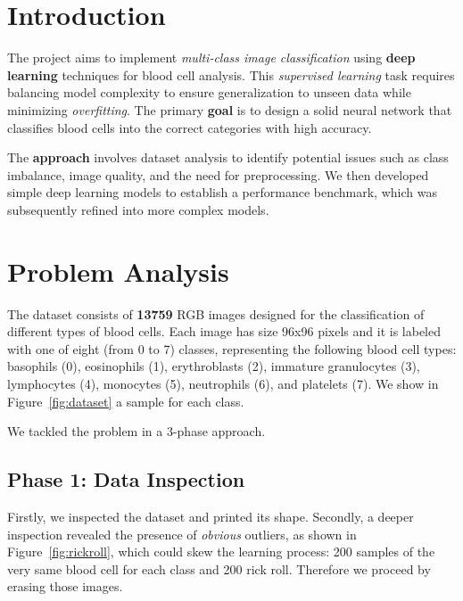 \documentclass[11pt]{article}
\begin{document}
    \begin{multicols*}{2}        
        \section{Introduction}

        The project aims to implement \textit{multi-class image classification} using \textbf{deep learning} techniques for blood cell analysis. This \textit{supervised learning} task requires balancing model complexity to ensure generalization to unseen data while minimizing \textit{overfitting}. The primary \textbf{goal} is to design a solid neural network that classifies blood cells into the correct categories with high accuracy.
        
        The \textbf{approach} involves dataset analysis to identify potential issues such as class imbalance, image quality, and the need for preprocessing. We then developed simple deep learning models to establish a performance benchmark, which was subsequently refined into more complex models.
        
        \section{Problem Analysis}

        The dataset consists of \textbf{13759} RGB images designed for the classification of different types of blood cells. Each image has size 96x96 pixels and it is labeled with one of eight (from 0 to 7) classes, representing the following blood cell types: basophils (0), eosinophils (1), erythroblasts (2), immature granulocytes (3), lymphocytes (4), monocytes (5), neutrophils (6), and platelets (7). We show in Figure~\ref{fig:dataset} a sample for each class.


        We tackled the problem in a 3-phase approach.

        \subsection{Phase 1: Data Inspection}

        Firstly, we inspected the dataset and printed its shape. Secondly, a deeper inspection revealed the presence of \textit{obvious} outliers, as shown in Figure~\ref{fig:rickroll}, which could skew the learning process: 200 samples of the very same blood cell for each class and 200 rick roll. Therefore we proceed by erasing those images.


\end{multicols*}
\end{document}
